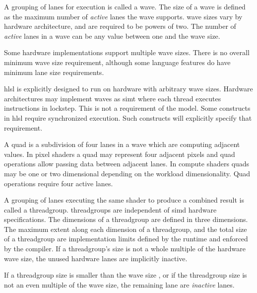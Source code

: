 
\p A grouping of \gls{lane}s for execution is called a \gls{wave}. The size of a
\gls{wave} is defined as the maximum number of \textit{active} \gls{lane}s the
\gls{wave} supports. \gls{wave} sizes vary by hardware architecture, and are required
to be powers of two. The number of \textit{active} \gls{lane}s in a \gls{wave}
can be any value between one and the \gls{wave} size.

\p Some hardware implementations support multiple \gls{wave} sizes. There is no
overall minimum wave size requirement, although some language features do have
minimum \gls{lane} size requirements.

\p \acrshort{hlsl} is explicitly designed to run on hardware with arbitrary
\gls{wave} sizes. Hardware architectures may implement \gls{wave}s as
\acrfull{simt} where each thread executes instructions in lockstep. This is not
a requirement of the model. Some constructs in \acrshort{hlsl} require
synchronized execution. Such constructs will explicitly specify that
requirement.


\p A \gls{quad} is a subdivision of four \gls{lane}s in a \gls{wave} which are
computing adjacent values. In pixel shaders a \gls{quad} may represent four
adjacent pixels and \gls{quad} operations allow passing data between adjacent
\gls{lane}s. In compute shaders quads may be one or two dimensional depending
on the workload dimensionality. Quad operations require four active \gls{lane}s.


\p A grouping of \gls{lane}s executing the same shader to produce a combined
result is called a \gls{threadgroup}. \gls{threadgroup}s are independent of
\acrshort{simd} hardware specifications. The dimensions of a \gls{threadgroup}
are defined in three dimensions. The maximum extent along each dimension of a
\gls{threadgroup}, and the total size of a \gls{threadgroup} are implementation
limits defined by the runtime and enforced by the compiler. If a
\gls{threadgroup}'s size is not a whole multiple of the hardware \gls{wave}
size, the unused hardware \gls{lane}s are implicitly inactive.

\p If a \gls{threadgroup} size is smaller than the \gls{wave} size , or if the
\gls{threadgroup} size is not an even multiple of the \gls{wave} size, the
remaining \gls{lane} are \textit{inactive} \gls{lane}s.

